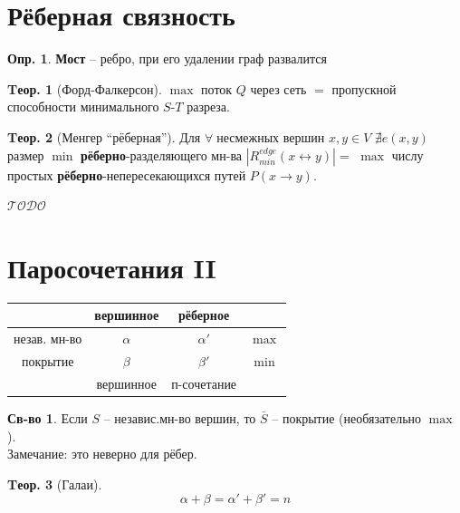 \documentclass[a4paper,12pt]{article}
\numberwithin{figure}{section}
\theoremstyle{definition}
\newtheorem{definition}{Опр.}[section]
\newtheorem*{property}{Св-во}  %
\theoremstyle{definition}
\newtheorem{theorem}{Tеор.}[section]
\def\iiany{$\forall\;$}
\def\iiTODO{\guillemotleft$\mathcal{TODO}$\guillemotright\textellipsis}
\begin{document}
\section{Рёберная связность}

\begin{definition}
	\textbf{Мост} -- ребро, при его удалении граф развалится
\end{definition}

\begin{theorem}[Форд-Фалкерсон]
	$\max$ поток $Q$ через сеть $=$ пропускной способности минимального $S$-$T$ разреза.
\end{theorem}

\begin{theorem}[Менгер ``рёберная'']
	Для \iiany несмежных вершин $x,y \in V$ $\nexists e(x,y)$ размер $\min$ \textbf{рёберно}-разделяющего мн-ва $|R^{edge}_{min}(x \leftrightarrow y)|=$ $\max$ числу простых \textbf{рёберно}-непересекающихся путей $P(x \rightarrow y)$.
\end{theorem}

\iiTODO



\section{Паросочетания II}

\begin{center}
  \begin{tabular}{|c|c|c|c|}
	\cline{2-3}
	\multicolumn{1}{c|}{} & вершинное & рёберное     & \multicolumn{1}{|c}{} \\ \hline
	незав. мн-во          & $\alpha$  & $\alpha'$    & $\max$                \\ \hline
	покрытие              & $\beta$   & $\beta'$     & $\min$                \\ \hline
	\multicolumn{1}{c|}{} & вершинное & п-сочетание  & \multicolumn{1}{|c}{} \\ \cline{2-3}
  \end{tabular}
\end{center}

\begin{property}
	Если $S$ -- независ.мн-во вершин, то $\bar{S}$ -- покрытие (необязательно $\max$).\\
	Замечание: это неверно для рёбер.
\end{property}

\begin{theorem}[Галаи]
	\[ \alpha + \beta = \alpha' + \beta' = n \]
\end{theorem}
\end{document}
